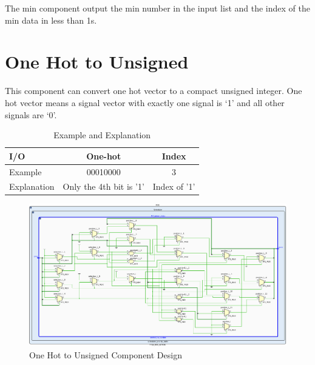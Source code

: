 The min component output the min number in the input list and the index of the min data in less than 1s.

\section{One Hot to Unsigned}

This component can convert one hot vector to a compact unsigned integer. One hot vector means a signal vector with exactly one signal is ‘1’ and all other signals are ‘0’.

 \begin{table}[htb]
	\centering
	\caption{Example and Explanation }
	\begin{tabular}{l c c}
		\toprule
		I/O  &  One-hot  & Index \\ \midrule
		Example  &  00010000 & 3\\
		Explanation  & Only the 4th bit is '1'  & Index of '1'  \\
		\bottomrule
	\end{tabular}
	\label{tab:tab-o2n}
\end{table}
         \begin{figure}[htb]
	\centering
	\includegraphics[width=.8\linewidth]{figures/o2n.png}
	\caption{One Hot to Unsigned Component Design}
	\label{fig:o2n}
\end{figure}
 
